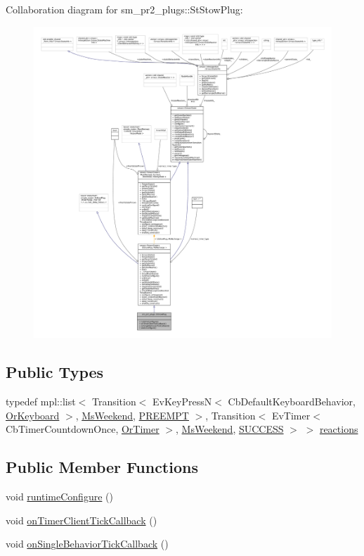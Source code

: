 Collaboration diagram for sm\+\_\+pr2\+\_\+plugs\+:\+:St\+Stow\+Plug\+:
\nopagebreak
\begin{figure}[H]
\begin{center}
\leavevmode
\includegraphics[width=350pt]{structsm__pr2__plugs_1_1StStowPlug__coll__graph}
\end{center}
\end{figure}
\subsection*{Public Types}
\begin{DoxyCompactItemize}
\item 
typedef mpl\+::list$<$ Transition$<$ Ev\+Key\+PressN$<$ Cb\+Default\+Keyboard\+Behavior, \hyperlink{classsm__pr2__plugs_1_1OrKeyboard}{Or\+Keyboard} $>$, \hyperlink{classsm__pr2__plugs_1_1MsWeekend}{Ms\+Weekend}, \hyperlink{classPREEMPT}{P\+R\+E\+E\+M\+PT} $>$, Transition$<$ Ev\+Timer$<$ Cb\+Timer\+Countdown\+Once, \hyperlink{classsm__pr2__plugs_1_1OrTimer}{Or\+Timer} $>$, \hyperlink{classsm__pr2__plugs_1_1MsWeekend}{Ms\+Weekend}, \hyperlink{classSUCCESS}{S\+U\+C\+C\+E\+SS} $>$ $>$ \hyperlink{structsm__pr2__plugs_1_1StStowPlug_ae6fc5bead24e3da64657c062438d35b0}{reactions}
\end{DoxyCompactItemize}
\subsection*{Public Member Functions}
\begin{DoxyCompactItemize}
\item 
void \hyperlink{structsm__pr2__plugs_1_1StStowPlug_a7a8c96a9affcf5e333fc0e96575141ec}{runtime\+Configure} ()
\item 
void \hyperlink{structsm__pr2__plugs_1_1StStowPlug_ae757556cb3fd58c9db771327744973bf}{on\+Timer\+Client\+Tick\+Callback} ()
\item 
void \hyperlink{structsm__pr2__plugs_1_1StStowPlug_a69f661686818a913827a9048ebe4d259}{on\+Single\+Behavior\+Tick\+Callback} ()
\end{DoxyCompactItemize}
